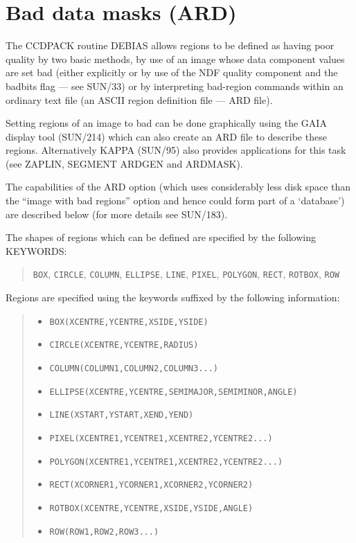 \documentclass[twoside,11pt]{article}
\newcommand{\htmlref}[2]{#1}
\newcommand{\xref}[3]{#1}
\newcommand{\xlabel}[1]{}
\renewcommand{\_}{\texttt{\symbol{95}}}
\newenvironment{myquote}{\begin{quote}\begin{small}}{\end{small}\end{quote}}
\newcommand{\text}[1]{{\small \tt #1}}
\newcommand{\xroutine}[1]{\htmlref{{\sc #1}}{#1}}
\begin{document}
\section{Bad data masks (ARD) \label{datamasks} \xlabel{datamasks}}
The CCDPACK routine \xroutine{DEBIAS} allows regions to be defined as
having poor quality by two basic methods, by use of an image whose data
component values are set bad (either explicitly or by use of the
NDF quality component and the badbits flag --- see \xref{SUN/33}{sun33}{})
or by interpreting bad-region commands within an ordinary text file
(an ASCII region definition file --- \xref{ARD}{sun183}{} file).

Setting regions of an image to bad can be done graphically using the
GAIA display tool (\xref{SUN/214}{sun214}{}) which can also create an
ARD file to describe these regions. Alternatively
\xref{KAPPA (SUN/95)}{sun95}{} also provides applications for this
task (see \xref{ZAPLIN}{sun95}{ZAPLIN}, \xref{SEGMENT}{sun95}{SEGMENT}
\xref{ARDGEN}{sun95}{ARDGEN} and \xref{ARDMASK}{sun95}{ARDMASK}).

The capabilities of the ARD option (which uses considerably less disk
space than the ``image with bad regions'' option and hence could form
part of a `database') are described below (for more details see
\xref{SUN/183}{sun183}{}).

The shapes of regions which can be defined are specified by the
following KEYWORDS:
\begin{myquote}
\text{BOX}, \text{CIRCLE}, \text{COLUMN}, \text{ELLIPSE}, \text{LINE},
\text{PIXEL}, \text{POLYGON}, \text{RECT}, \text{ROTBOX}, \text{ROW}
\end{myquote}

Regions are specified using the keywords suffixed by the following
information:
\begin{myquote}
\begin{itemize}
\item \text{BOX(XCENTRE,YCENTRE,XSIDE,YSIDE)}
\item \text{CIRCLE(XCENTRE,YCENTRE,RADIUS)}
\item \text{COLUMN(COLUMN1,COLUMN2,COLUMN3...)}
\item \text{ELLIPSE(XCENTRE,YCENTRE,SEMIMAJOR,SEMIMINOR,ANGLE)}
\item \text{LINE(XSTART,YSTART,XEND,YEND)}
\item \text{PIXEL(XCENTRE1,YCENTRE1,XCENTRE2,YCENTRE2...)}
\item \text{POLYGON(XCENTRE1,YCENTRE1,XCENTRE2,YCENTRE2...)}
\item \text{RECT(XCORNER1,YCORNER1,XCORNER2,YCORNER2)}
\item \text{ROTBOX(XCENTRE,YCENTRE,XSIDE,YSIDE,ANGLE)}
\item \text{ROW(ROW1,ROW2,ROW3...)}
\end{itemize}
\end{myquote}
\end{document}
